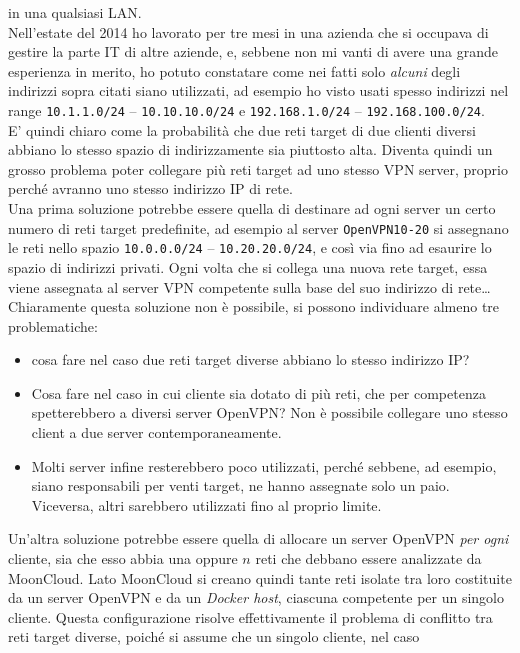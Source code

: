in una qualsiasi LAN.\\
Nell'estate del 2014 ho lavorato per tre mesi in una azienda che si occupava di
gestire la parte IT di altre aziende, e, sebbene non mi vanti di avere una grande
esperienza in merito, ho potuto constatare come nei fatti solo \textit{alcuni}
degli indirizzi sopra citati siano utilizzati, ad esempio ho visto usati
spesso indirizzi nel range \texttt{10.1.1.0/24} -- \texttt{10.10.10.0/24} e
\texttt{192.168.1.0/24} -- \texttt{192.168.100.0/24}.\\
E' quindi chiaro come la probabilità che due reti target di due clienti diversi
abbiano lo stesso spazio di indirizzamente sia piuttosto alta. Diventa
quindi un grosso problema poter collegare più
reti target ad uno stesso VPN server, proprio perché avranno uno stesso indirizzo IP
di rete.\\
Una prima soluzione potrebbe essere quella di destinare ad ogni server un certo
numero di reti target predefinite, ad esempio al server \texttt{OpenVPN10-20}
si assegnano le reti nello spazio \texttt{10.0.0.0/24} -- \texttt{10.20.20.0/24},
e così via fino ad esaurire lo spazio di indirizzi privati. Ogni volta che
si collega una nuova rete target, essa viene assegnata al server VPN competente
sulla base del suo indirizzo di rete\ldots Chiaramente questa soluzione non è
possibile, si possono individuare almeno tre problematiche:
\begin{itemize}
  \item cosa fare nel caso due reti target diverse abbiano lo stesso indirizzo IP?
  \item Cosa fare nel caso in cui cliente sia dotato di più reti, che per competenza
  spetterebbero a diversi server OpenVPN? Non è possibile collegare uno stesso client
  a due server contemporaneamente.
  \item Molti server infine resterebbero poco utilizzati, perché sebbene, ad esempio,
  siano responsabili per venti target, ne hanno assegnate solo un paio. Viceversa,
  altri sarebbero utilizzati fino al proprio limite.
\end{itemize}
Un'altra soluzione potrebbe essere quella di allocare un server OpenVPN
\textit{per ogni} cliente, sia che esso abbia una oppure $n$ reti che debbano essere
analizzate da MoonCloud. Lato MoonCloud si creano quindi tante reti isolate tra loro
costituite da un server OpenVPN e da un \textit{Docker host}, ciascuna competente
per un singolo cliente. Questa configurazione risolve effettivamente il problema di
conflitto tra reti target diverse, poiché si assume che un singolo cliente, nel caso
